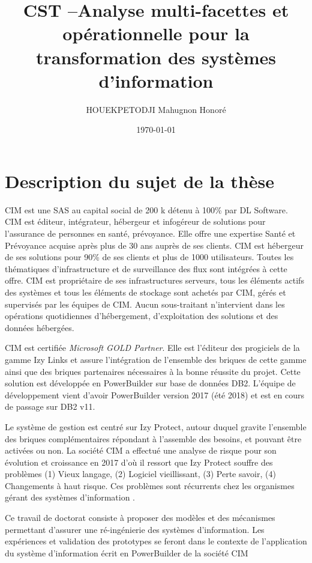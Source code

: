 \documentclass[a4paper]{article}
\title{CST --Analyse multi-facettes et opérationnelle pour la transformation des systèmes d’information}
\author{ HOUEKPETODJI Mahugnon Honoré}
\begin{document}
\institution{}

\date{\today}

\maketitle

\section{Description du sujet de la thèse}
CIM est une SAS au capital social de 200 k détenu à 100\% par DL Software. 
CIM est éditeur, intégrateur, hébergeur et infogéreur de solutions pour l'assurance de personnes en santé, prévoyance. 
Elle offre une expertise Santé et Prévoyance acquise après plus de 30 ans auprès de ses clients. 
CIM est hébergeur de ses solutions pour 90\% de ses clients et plus de 1000 utilisateurs. 
Toutes les thématiques d'infrastructure et de surveillance des flux sont intégrées à cette offre.
CIM est propriétaire de ses infrastructures serveurs, tous les éléments actifs des systèmes et tous les éléments de stockage sont achetés par CIM, gérés et supervisés par les équipes de CIM. Aucun sous-traitant n'intervient dans les opérations quotidiennes d'hébergement, d'exploitation des solutions et des données hébergées.

CIM est certifiée \textit{Microsoft GOLD Partner}. 
Elle est l'éditeur des progiciels de la gamme Izy Links et assure l'intégration de l'ensemble des briques de cette gamme ainsi que des briques partenaires nécessaires à la bonne réussite du projet. Cette solution est développée en PowerBuilder sur base de données DB2.
L'équipe de développement vient d'avoir PowerBuilder version 2017 (été 2018) et est en cours de passage sur DB2 v11.

Le système de gestion est centré sur Izy Protect, autour duquel gravite l'ensemble des briques complémentaires répondant à l'assemble des besoins, et pouvant être activées ou non. 
La société CIM a effectué une analyse de risque pour son évolution et croissance en 2017 d'où il ressort que Izy Protect souffre des problèmes 
(1) Vieux langage,
(2) Logiciel vieillissant,
(3) Perte savoir,
(4) Changements à haut risque.
Ces problèmes sont récurrents chez les organismes gérant des systèmes d'information \cite{Deme02a}.

Ce travail de doctorat consiste à proposer des modèles et des mécanismes permettant d'assurer une ré-ingénierie des systèmes d'information. 
Les expériences et validation des prototypes se feront dans le contexte de l'application du système d'information écrit en PowerBuilder de la société CIM
\end{document}
